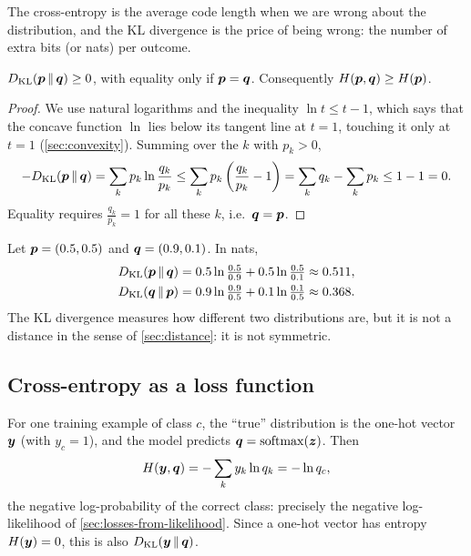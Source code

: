 The cross-entropy is the average code length when we are wrong about the
distribution, and the KL divergence is the price of being wrong: the number of
extra bits (or nats) per outcome.

\begin{theorem}\label{thm:gibbs}
$D_{\operatorname{KL}}(\bm{p} \,\Vert\, \bm{q}) \ge 0$, with equality only if $\bm{p} = \bm{q}$. Consequently
$H(\bm{p}, \bm{q}) \ge H(\bm{p})$.
\end{theorem}

\begin{proof}
We use natural logarithms and the inequality $\ln t \le t - 1$, which says that the
concave function $\ln$ lies below its tangent line at $t = 1$, touching it only
at $t = 1$ (\cref{sec:convexity}). Summing over the $k$ with $p_k > 0$,
\[
  -D_{\operatorname{KL}}(\bm{p} \,\Vert\, \bm{q}) = \sum_kp_k\ln\frac{q_k}{p_k}
  \le \sum_kp_k\left(\frac{q_k}{p_k} - 1\right) = \sum_kq_k - \sum_kp_k
  \le 1 - 1 = 0 .
\]
Equality requires $\frac{q_k}{p_k} = 1$ for all these $k$, i.e.\ $\bm{q} = \bm{p}$.
\end{proof}

\begin{example}\label{ex:kl}
Let $\bm{p} = (0.5, 0.5)$ and $\bm{q} = (0.9, 0.1)$. In nats,
\begin{align*}
  D_{\operatorname{KL}}(\bm{p} \,\Vert\, \bm{q}) &= 0.5\ln\tfrac{0.5}{0.9} + 0.5\ln\tfrac{0.5}{0.1} \approx 0.511,\\
  D_{\operatorname{KL}}(\bm{q} \,\Vert\, \bm{p}) &= 0.9\ln\tfrac{0.9}{0.5} + 0.1\ln\tfrac{0.1}{0.5} \approx 0.368 .
\end{align*}
The KL divergence measures how different two distributions are, but it is not
a distance in the sense of \cref{sec:distance}: it is not symmetric.
\end{example}

\subsection{Cross-entropy as a loss function}

For one training example of class $c$, the ``true'' distribution is the one-hot
vector $\bm{y}$ (with $y_c = 1$), and the model predicts $\bm{q} = \operatorname{softmax}(\bm{z})$. Then
\[
  H(\bm{y}, \bm{q}) = -\sum_ky_k\ln q_k = -\ln q_c ,
\]
the negative log-probability of the correct class: precisely the negative
log-likelihood of \cref{sec:losses-from-likelihood}. Since a one-hot vector has
entropy $H(\bm{y}) = 0$, this is also $D_{\operatorname{KL}}(\bm{y} \,\Vert\, \bm{q})$.

